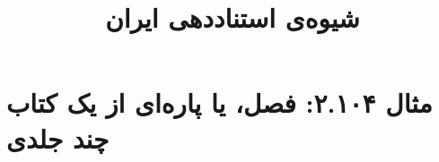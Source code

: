 \documentclass[a4paper,10pt]{article}
\begin{document}
\title{شیوه‌ی استناددهی ایران
 }
\author{}
\date{}
\maketitle



\section*{مثال ۲.۱۰۴: فصل، یا پاره‌ای از یک کتاب چند جلدی}

\cite{صفا1368}\\
\cite{bonnefoy1991}\\






\end{document}

